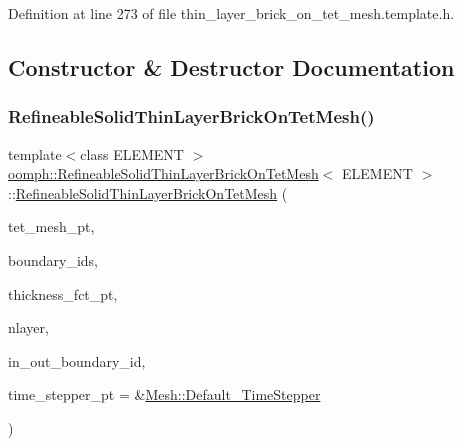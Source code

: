 Definition at line 273 of file thin\+\_\+layer\+\_\+brick\+\_\+on\+\_\+tet\+\_\+mesh.\+template.\+h.



\subsection{Constructor \& Destructor Documentation}
\mbox{\label{classoomph_1_1RefineableSolidThinLayerBrickOnTetMesh_adda15e0208b20e1c1f5404c27850fb1b}} 
\subsubsection{\texorpdfstring{Refineable\+Solid\+Thin\+Layer\+Brick\+On\+Tet\+Mesh()}{RefineableSolidThinLayerBrickOnTetMesh()}}
{\footnotesize\ttfamily template$<$class E\+L\+E\+M\+E\+NT $>$ \\
\hyperlink{classoomph_1_1RefineableSolidThinLayerBrickOnTetMesh}{oomph\+::\+Refineable\+Solid\+Thin\+Layer\+Brick\+On\+Tet\+Mesh}$<$ E\+L\+E\+M\+E\+NT $>$\+::\hyperlink{classoomph_1_1RefineableSolidThinLayerBrickOnTetMesh}{Refineable\+Solid\+Thin\+Layer\+Brick\+On\+Tet\+Mesh} (\begin{DoxyParamCaption}\item[{\hyperlink{classoomph_1_1Mesh}{Mesh} $\ast$}]{tet\+\_\+mesh\+\_\+pt,  }\item[{const \hyperlink{classoomph_1_1Vector}{Vector}$<$ unsigned $>$ \&}]{boundary\+\_\+ids,  }\item[{\hyperlink{classoomph_1_1RefineableSolidThinLayerBrickOnTetMesh_a45af8cb1926cec40d597eb18b75b96da}{Thickness\+Fct\+Pt}}]{thickness\+\_\+fct\+\_\+pt,  }\item[{const unsigned \&}]{nlayer,  }\item[{const \hyperlink{classoomph_1_1Vector}{Vector}$<$ \hyperlink{classoomph_1_1Vector}{Vector}$<$ unsigned $>$ $>$ \&}]{in\+\_\+out\+\_\+boundary\+\_\+id,  }\item[{\hyperlink{classoomph_1_1TimeStepper}{Time\+Stepper} $\ast$}]{time\+\_\+stepper\+\_\+pt = {\ttfamily \&\hyperlink{classoomph_1_1Mesh_a12243d0fee2b1fcee729ee5a4777ea10}{Mesh\+::\+Default\+\_\+\+Time\+Stepper}} }\end{DoxyParamCaption})\hspace{0.3cm}{\ttfamily [inline]}}



